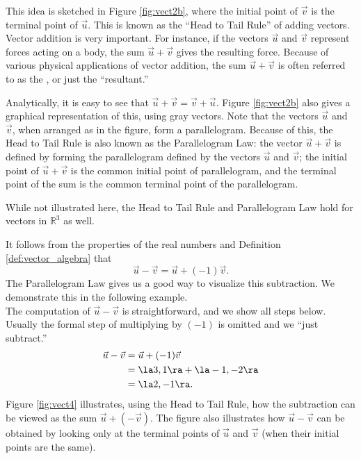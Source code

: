 This idea is sketched in Figure \ref{fig:vect2b}, where the initial point of $\vec v$ is the terminal point of $\vec u$. This is known as the ``Head to Tail Rule'' of adding vectors. Vector addition is very important. For instance, if the vectors $\vec u$ and $\vec v$ represent forces acting on a body, the sum $\vec u+\vec v$ gives the resulting force. Because of various physical applications of vector addition, the sum $\vec u+\vec v$ is often referred to as the , or just the ``resultant.''

Analytically, it is easy to see that $\vec u+\vec v = \vec v+\vec u$. Figure \ref{fig:vect2b} also gives a graphical representation of this, using gray vectors. Note that the vectors $\vec u$ and $\vec v$, when arranged as in the figure, form a parallelogram. Because of this, the Head to Tail Rule is also known as the Parallelogram Law: the vector $\vec u+\vec v$ is defined by forming the parallelogram defined by the vectors $\vec u$ and $\vec v$; the initial point of $\vec u+\vec v$ is the common initial point of parallelogram, and the terminal point of the sum is the common terminal point of the parallelogram.

While not illustrated here, the Head to Tail Rule and Parallelogram Law hold for vectors in $\mathbb{R}^3$ as well.

It follows from the properties of the real numbers and Definition \ref{def:vector_algebra} that $$\vec u-\vec v = \vec u + (-1)\vec v.$$ The Parallelogram Law gives us a good way to visualize this subtraction. We demonstrate this in the following example.\\

{The computation of $\vec u-\vec v$ is straightforward, and we show all steps below. Usually the formal step of multiplying by $(-1)$ is omitted and we ``just subtract.''
\begin{align*}
\vec u-\vec v &= \vec u + (-1)\vec v \\
							&= \la 3,1\ra + \la -1,-2\ra\\
							&= \la 2,-1\ra.
\end{align*}
Figure \ref{fig:vect4} illustrates, using the Head to Tail Rule, how the subtraction can be viewed as the  sum $\vec u + (-\vec v)$. The figure also illustrates how $\vec u-\vec v$ can be obtained by looking only at the terminal points of $\vec u$ and $\vec v$ (when their initial points are the same).}

